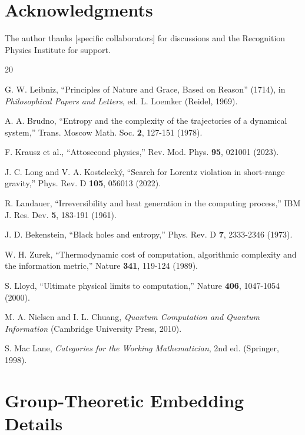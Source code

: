 \documentclass[12pt,a4paper]{article}
\begin{document}
\section*{Acknowledgments}

The author thanks [specific collaborators] for discussions and the Recognition Physics Institute for support.

\begin{thebibliography}{20}

G. W. Leibniz, ``Principles of Nature and Grace, Based on Reason'' (1714), in \textit{Philosophical Papers and Letters}, ed. L. Loemker (Reidel, 1969).

A. A. Brudno, ``Entropy and the complexity of the trajectories of a dynamical system,'' Trans. Moscow Math. Soc. \textbf{2}, 127-151 (1978).

F. Krausz et al., ``Attosecond physics,'' Rev. Mod. Phys. \textbf{95}, 021001 (2023).

J. C. Long and V. A. Kostelecký, ``Search for Lorentz violation in short-range gravity,'' Phys. Rev. D \textbf{105}, 056013 (2022).

R. Landauer, ``Irreversibility and heat generation in the computing process,'' IBM J. Res. Dev. \textbf{5}, 183-191 (1961).

J. D. Bekenstein, ``Black holes and entropy,'' Phys. Rev. D \textbf{7}, 2333-2346 (1973).

W. H. Zurek, ``Thermodynamic cost of computation, algorithmic complexity and the information metric,'' Nature \textbf{341}, 119-124 (1989).

S. Lloyd, ``Ultimate physical limits to computation,'' Nature \textbf{406}, 1047-1054 (2000).

M. A. Nielsen and I. L. Chuang, \textit{Quantum Computation and Quantum Information} (Cambridge University Press, 2010).

S. Mac Lane, \textit{Categories for the Working Mathematician}, 2nd ed. (Springer, 1998).

\end{thebibliography}

\appendix

\section{Group-Theoretic Embedding Details}
\end{document}
